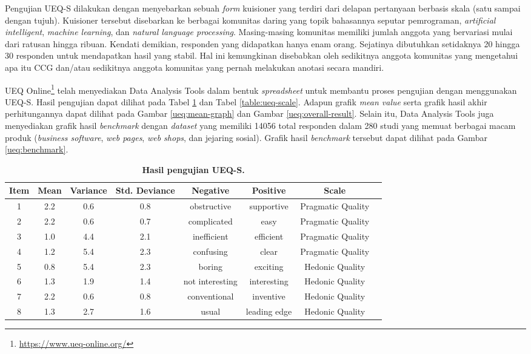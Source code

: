 Pengujian UEQ-S dilakukan dengan menyebarkan sebuah \textit{form} kuisioner yang terdiri dari
delapan pertanyaan berbasis skala (satu sampai dengan tujuh). Kuisioner tersebut disebarkan ke
berbagai komunitas daring yang topik bahasannya seputar pemrograman, \textit{artificial intelligent},
\textit{machine learning}, dan \textit{natural language processing}. Masing-masing komunitas
memiliki jumlah anggota yang bervariasi mulai dari ratusan hingga ribuan. Kendati demikian,
responden yang didapatkan hanya enam orang. Sejatinya dibutuhkan setidaknya 20 hingga 30 responden
untuk mendapatkan hasil yang stabil. Hal ini kemungkinan disebabkan oleh sedikitnya anggota
komunitas yang mengetahui apa itu CCG dan/atau sedikitnya anggota komunitas yang pernah melakukan
anotasi secara mandiri.

UEQ Online\footnote{\url{https://www.ueq-online.org/}} telah menyediakan Data Analysis Tools
dalam bentuk \textit{spreadsheet} untuk membantu proses pengujian dengan menggunakan UEQ-S.
Hasil pengujian dapat dilihat pada Tabel \ref{table:hasil-pengujian} dan Tabel \ref{table:ueq-scale}.
Adapun grafik \textit{mean value} serta grafik hasil akhir perhitungannya dapat dilihat pada Gambar
\ref{ueq:mean-graph} dan Gambar \ref{ueq:overall-result}. Selain itu, Data Analysis Tools
juga menyediakan grafik hasil \textit{benchmark} dengan \textit{dataset} yang memiliki
14056 total responden dalam 280 studi yang memuat berbagai macam produk
(\textit{business software}, \textit{web pages}, \textit{web shops}, dan jejaring sosial).
Grafik hasil \textit{benchmark} tersebut dapat dilihat pada Gambar \ref{ueq:benchmark}.

\begin{table}
\caption{\textbf{Hasil pengujian UEQ-S.}}
\label{table:hasil-pengujian}
\centering
\begin{tabular}{| c | c  | c | c | c | c | c | c |}
  \hline
  \textbf{Item} & \textbf{Mean} & \textbf{Variance} & \textbf{Std. Deviance} & \textbf{Negative} & \textbf{Positive} & \textbf{Scale} &  \\ [0.5ex] 
  \hline
  1 & 2.2 & 0.6 & 0.8 & obstructive & supportive & Pragmatic Quality & \cellcolor{blue!50} \\
  2 & 2.2 & 0.6 & 0.7 & complicated & easy & Pragmatic Quality & \cellcolor{blue!50} \\
  3 & 1.0 & 4.4 & 2.1 & inefficient & efficient & Pragmatic Quality & \cellcolor{blue!50} \\
  4 & 1.2 & 5.4 & 2.3 & confusing & clear & Pragmatic Quality & \cellcolor{blue!50} \\
  5 & 0.8 & 5.4 & 2.3 & boring & exciting & Hedonic Quality & \cellcolor[HTML]{FFC000} \\
  6 & 1.3 & 1.9 & 1.4 & not interesting & interesting & Hedonic Quality & \cellcolor[HTML]{FFC000} \\
  7 & 2.2 & 0.6 & 0.8 & conventional & inventive & Hedonic Quality & \cellcolor[HTML]{FFC000} \\
  8 & 1.3 & 2.7 & 1.6 & usual & leading edge & Hedonic Quality & \cellcolor[HTML]{FFC000} \\  [1ex] 
  \hline
\end{tabular}
\end{table}

